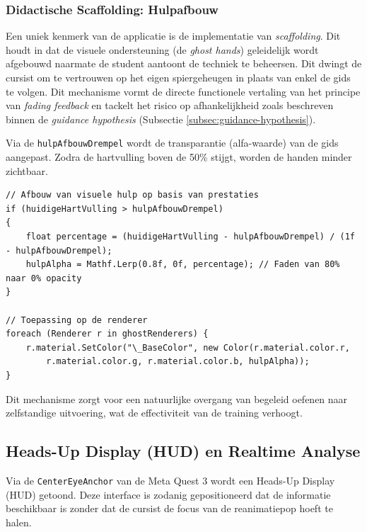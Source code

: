 \subsubsection{Didactische Scaffolding: Hulpafbouw}
Een uniek kenmerk van de applicatie is de implementatie van \textit{scaffolding}. Dit houdt in dat de visuele ondersteuning (de \textit{ghost hands}) 
geleidelijk wordt afgebouwd naarmate de student aantoont de techniek te beheersen. Dit dwingt de cursist om te vertrouwen op het eigen spiergeheugen in plaats van enkel de gids te volgen. 
Dit mechanisme vormt de directe functionele vertaling van het principe van \textit{fading feedback} en tackelt het risico op afhankelijkheid 
zoals beschreven binnen de \textit{guidance hypothesis} (Subsectie \ref{subsec:guidance-hypothesis}).

Via de \texttt{hulpAfbouwDrempel} wordt de transparantie (alfa-waarde) van de gids aangepast. Zodra de hartvulling boven de 50\% stijgt, worden de 
handen minder zichtbaar.

\begin{listing}[htbp]
\begin{verbatim}
// Afbouw van visuele hulp op basis van prestaties
if (huidigeHartVulling > hulpAfbouwDrempel) 
{
    float percentage = (huidigeHartVulling - hulpAfbouwDrempel) / (1f - hulpAfbouwDrempel);
    hulpAlpha = Mathf.Lerp(0.8f, 0f, percentage); // Faden van 80% naar 0% opacity
}

// Toepassing op de renderer
foreach (Renderer r in ghostRenderers) {
    r.material.SetColor("\_BaseColor", new Color(r.material.color.r, 
        r.material.color.g, r.material.color.b, hulpAlpha));
}
\end{verbatim}
\caption{Algoritme voor de stapsgewijze visuele hulpafbouw (scaffolding) via \texttt{Mathf.Lerp}.}
\label{lst:scaffolding_hulpafbouw}
\end{listing}

Dit mechanisme zorgt voor een natuurlijke overgang van begeleid oefenen naar zelfstandige uitvoering, wat de effectiviteit van de training verhoogt.

\subsection{Heads-Up Display (HUD) en Realtime Analyse}
Via de \texttt{CenterEyeAnchor} van de Meta Quest 3 wordt een Heads-Up Display (HUD) getoond. Deze interface is zodanig 
gepositioneerd dat de informatie beschikbaar is zonder dat de cursist de focus van de reanimatiepop hoeft te halen.


